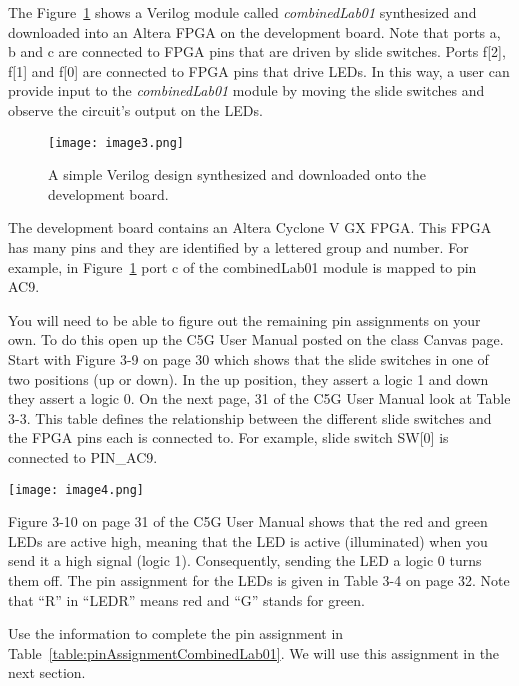 The Figure~\ref{fig:simpleVerilogDownload} shows a Verilog module called \emph{combinedLab01}
synthesized and downloaded into an Altera FPGA on the development board.
Note that ports a, b and c are connected to FPGA pins that are driven by
slide switches. Ports f{[}2{]}, f{[}1{]} and f{[}0{]} are connected to
FPGA pins that drive LEDs. In this way, a user can provide input to the
\emph{combinedLab01} module by moving the slide switches and observe the
circuit's output on the LEDs.

\begin{figure}[ht]
\caption{A simple Verilog design synthesized and downloaded onto the development board.}
\texttt{[image: image3.png]}
\label{fig:simpleVerilogDownload}
\end{figure}

The development board contains an Altera Cyclone V GX FPGA. This FPGA
has many pins and they are identified by a lettered group and number.
For example, in Figure~\ref{fig:simpleVerilogDownload} port c of 
the combinedLab01 module is mapped to pin AC9.

You will need to be able to figure out the remaining pin assignments on
your own. To do this open up the C5G User Manual posted on the class Canvas
page. Start with Figure 3-9 on page 30 which shows that the slide switches in one 
of two positions (up or down). In the up position, they assert a logic 1 and down
they assert a logic 0.  On the next page, 31 of the C5G User Manual look
at Table 3-3. This table defines the relationship between the different slide
switches and the FPGA pins each is connected to.  For example, slide switch 
SW{[}0{]} is connected to PIN\_AC9.

\texttt{[image: image4.png]}

Figure 3-10 on page 31 of the C5G User Manual shows that the red and
green LEDs are active high, meaning that the LED is active (illuminated) when 
you send it a high signal (logic 1). Consequently, sending the LED a logic 0 turns 
them off.   The pin assignment for the LEDs is given in Table 3-4 on page 32.
Note that ``R'' in ``LEDR'' means red and ``G'' stands for green.


Use the information to complete the pin assignment in 
Table~\ref{table:pinAssignmentCombinedLab01}.  We 
will use this assignment in the next section.


